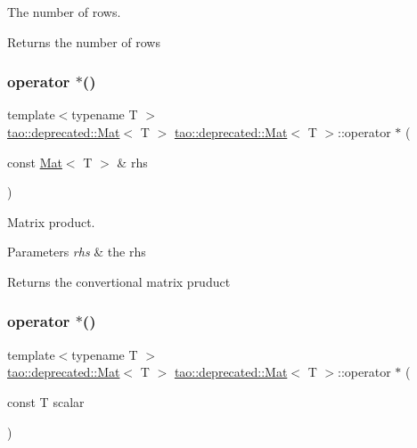 The number of rows. 

\begin{DoxyReturn}{Returns}
the number of rows 
\end{DoxyReturn}
\mbox{\label{classtao_1_1deprecated_1_1_mat_a4cd6c4ed3705000357fe242d468f5329}} 
\subsubsection{\texorpdfstring{operator $\ast$()}{operator *()}\hspace{0.1cm}{\footnotesize\ttfamily [1/2]}}
{\footnotesize\ttfamily template$<$typename T $>$ \\
\mbox{\hyperlink{classtao_1_1deprecated_1_1_mat}{tao\+::deprecated\+::\+Mat}}$<$ T $>$ \mbox{\hyperlink{classtao_1_1deprecated_1_1_mat}{tao\+::deprecated\+::\+Mat}}$<$ T $>$\+::operator $\ast$ (\begin{DoxyParamCaption}\item[{const \mbox{\hyperlink{classtao_1_1deprecated_1_1_mat}{Mat}}$<$ T $>$ \&}]{rhs }\end{DoxyParamCaption})}



Matrix product. 


\begin{DoxyParams}{Parameters}
{\em rhs} & the rhs \\
\hline
\end{DoxyParams}
\begin{DoxyReturn}{Returns}
the convertional matrix pruduct 
\end{DoxyReturn}
\mbox{\label{classtao_1_1deprecated_1_1_mat_a2dc34699cf25a6097dc7cb8f556a7d9e}} 
\subsubsection{\texorpdfstring{operator $\ast$()}{operator *()}\hspace{0.1cm}{\footnotesize\ttfamily [2/2]}}
{\footnotesize\ttfamily template$<$typename T $>$ \\
\mbox{\hyperlink{classtao_1_1deprecated_1_1_mat}{tao\+::deprecated\+::\+Mat}}$<$ T $>$ \mbox{\hyperlink{classtao_1_1deprecated_1_1_mat}{tao\+::deprecated\+::\+Mat}}$<$ T $>$\+::operator $\ast$ (\begin{DoxyParamCaption}\item[{const T}]{scalar }\end{DoxyParamCaption})}



